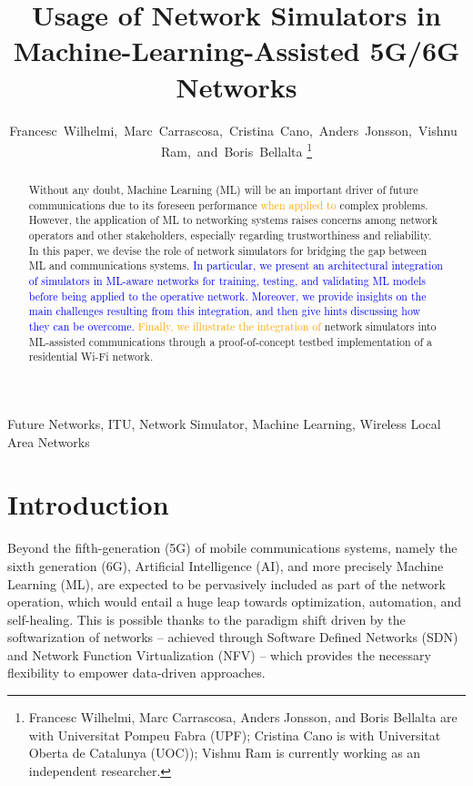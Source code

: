 \documentclass[journal]{IEEEtran}
\begin{document}
	\title{Usage of Network Simulators in \\Machine-Learning-Assisted 5G/6G Networks}
	
	\author{Francesc~Wilhelmi,~Marc~Carrascosa,~Cristina~Cano,~Anders~Jonsson,~Vishnu~Ram,~and~Boris~Bellalta%
		\thanks{Francesc Wilhelmi, Marc Carrascosa, Anders Jonsson, and Boris Bellalta are with Universitat Pompeu Fabra (UPF); Cristina Cano is with Universitat Oberta de Catalunya (UOC)); Vishnu Ram is currently working as an independent researcher.}%
	}
	
	\maketitle
	
	\begin{abstract}
		Without any doubt, Machine Learning (ML) will be an important driver of future communications due to its foreseen performance \textcolor{orange}{when applied to} complex problems. However, the application of ML to networking systems raises concerns among network operators and other stakeholders, especially regarding trustworthiness and reliability. In this paper, we devise the role of network simulators for bridging the gap between ML and communications systems. \textcolor{blue}{In particular, we present an architectural integration of simulators in ML-aware networks for training, testing, and validating ML models before being applied to the operative network. Moreover, we provide insights on the main challenges resulting from this integration, and then give hints discussing how they can be overcome.} \textcolor{orange}{Finally, we illustrate the integration of} network simulators into ML-assisted communications through a proof-of-concept testbed implementation of a residential Wi-Fi network. 
	\end{abstract}
	
	\begin{IEEEkeywords}
		Future Networks, ITU, Network Simulator, Machine Learning, Wireless Local Area Networks
	\end{IEEEkeywords}
	
	\IEEEpeerreviewmaketitle
	
	\section{Introduction}
	
	Beyond the fifth-generation (5G) of mobile communications systems, namely the sixth generation (6G), Artificial Intelligence (AI), and more precisely Machine Learning (ML), are expected to be pervasively included as part of the network operation, which would entail a huge leap towards optimization, automation, and self-healing. This is possible thanks to the paradigm shift driven by the softwarization of networks -- achieved through Software Defined Networks (SDN) and Network Function Virtualization (NFV) -- which provides the necessary flexibility to empower data-driven approaches.
	
\end{document}
